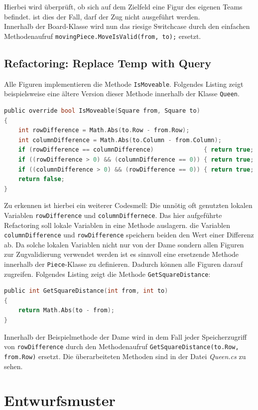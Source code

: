 \documentclass[
10pt, %
a4paper, %
oneside, %
headinclude,footinclude, %
BCOR5mm, %
]{scrartcl}
\begin{document}
\begin{onehalfspace}
Hierbei wird überprüft, ob sich auf dem Zielfeld eine Figur des eigenen Teams befindet. ist dies der Fall, darf der Zug nicht ausgeführt werden.\\
Innerhalb der Board-Klasse wird nun das riesige Switchcase durch den einfachen Methodenaufruf \texttt{movingPiece.MoveIsValid(from, to);} ersetzt.

\subsection{Refactoring: Replace Temp with Query}
\label{sec:replTemp}
Alle Figuren implementieren die Methode \texttt{IsMoveable}. Folgendes Listing zeigt beispielsweise eine ältere Version dieser Methode innerhalb der Klasse \texttt{Queen}.


\begin{lstlisting}[language=c, style=mStyle]
public override bool IsMoveable(Square from, Square to)
{
	int rowDifference = Math.Abs(to.Row - from.Row);
	int columnDifference = Math.Abs(to.Column - from.Column);
	if (rowDifference == columnDifference)              { return true; }
	if ((rowDifference > 0) && (columnDifference == 0)) { return true; }
	if ((columnDifference > 0) && (rowDifference == 0)) { return true; }
	return false;
}
\end{lstlisting}
Zu erkennen ist hierbei ein weiterer Codesmell: Die unnötig oft genutzten lokalen Variablen \texttt{rowDifference} und \texttt{columnDiffernece}. Das hier aufgeführte Refactoring soll lokale Variablen in eine Methode auslagern. die Variablen \texttt{columnDifference} und \texttt{rowDifference} speichern beiden den Wert einer Differenz ab. Da solche lokalen Variablen nicht nur von der Dame sondern allen Figuren zur Zugvalidierung verwendet werden ist es sinnvoll eine ersetzende Methode innerhalb der \texttt{Piece}-Klasse zu definieren. Dadurch können alle Figuren darauf zugreifen. Folgendes Listing zeigt die Methode \texttt{GetSquareDistance}:

\begin{lstlisting}[language=c, style=mStyle]
public int GetSquareDistance(int from, int to)
{
	return Math.Abs(to - from);
}
\end{lstlisting}

Innerhalb der Beispielmethode der Dame wird in dem Fall jeder Speicherzugriff von \texttt{rowDifference} durch den Methodenaufruf \texttt{GetSquareDistance(to.Row, from.Row)} ersetzt. Die überarbeiteten Methoden sind in der Datei \textit{Queen.cs} zu sehen. 
\newpage
\section{Entwurfsmuster}


\end{onehalfspace}
\end{document}
